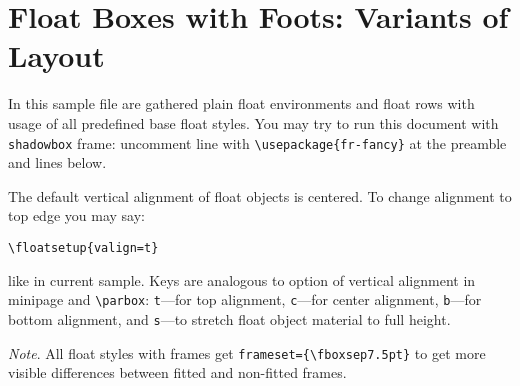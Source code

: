 \documentclass{book}
\begin{document}
\chapter{Float Boxes with Foots: Variants of Layout}

In this sample file are gathered plain float environments and float rows
with usage of all predefined base float styles. You may try to run this document
with \texttt{shadowbox} frame: uncomment line with \verb|\usepackage{fr-fancy}|
at the preamble and lines below.

The default vertical alignment of float objects is centered.
To change alignment to top edge you may say:
\begin{verbatim}
\floatsetup{valign=t}
\end{verbatim}
like in current sample.
Keys are analogous to option of vertical alignment in minipage and \verb|\parbox|:
\texttt{t}---for top alignment, \texttt{c}---for center alignment,
\texttt{b}---for bottom alignment, and \texttt{s}---to stretch float object material
to full height.

\emph{Note}. All float styles with frames get \verb|frameset={\fboxsep7.5pt}|
to get more visible differences between fitted and non-fitted frames.

\end{document}
